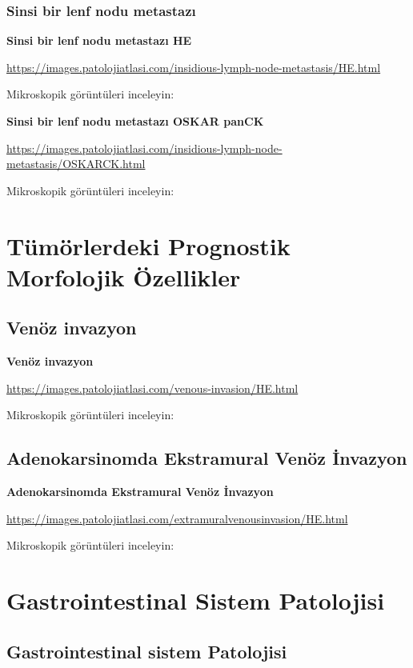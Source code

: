 \documentclass[
  letterpaper,
  DIV=11,
  numbers=noendperiod]{scrreprt}
\begin{document}
\hypertarget{sinsi-bir-lenf-nodu-metastazux131}{%
\section{Sinsi bir lenf nodu
metastazı}\label{sinsi-bir-lenf-nodu-metastazux131}}

\textbf{Sinsi bir lenf nodu metastazı HE}

\url{https://images.patolojiatlasi.com/insidious-lymph-node-metastasis/HE.html}

Mikroskopik görüntüleri inceleyin:

\textbf{Sinsi bir lenf nodu metastazı OSKAR panCK}

\url{https://images.patolojiatlasi.com/insidious-lymph-node-metastasis/OSKARCK.html}

Mikroskopik görüntüleri inceleyin:

\part{Tümörlerdeki Prognostik Morfolojik Özellikler}

\hypertarget{venuxf6z-invazyon}{%
\chapter{Venöz invazyon}\label{venuxf6z-invazyon}}

\textbf{Venöz invazyon}

\url{https://images.patolojiatlasi.com/venous-invasion/HE.html}

Mikroskopik görüntüleri inceleyin:

\hypertarget{adenokarsinomda-ekstramural-venuxf6z-invazyon}{%
\chapter{Adenokarsinomda Ekstramural Venöz
İnvazyon}\label{adenokarsinomda-ekstramural-venuxf6z-invazyon}}

\textbf{Adenokarsinomda Ekstramural Venöz İnvazyon}

\url{https://images.patolojiatlasi.com/extramuralvenousinvasion/HE.html}

Mikroskopik görüntüleri inceleyin:

\part{Gastrointestinal Sistem Patolojisi}

\hypertarget{gastrointestinal-sistem-patolojisi-1}{%
\chapter{Gastrointestinal sistem
Patolojisi}\label{gastrointestinal-sistem-patolojisi-1}}
\end{document}
